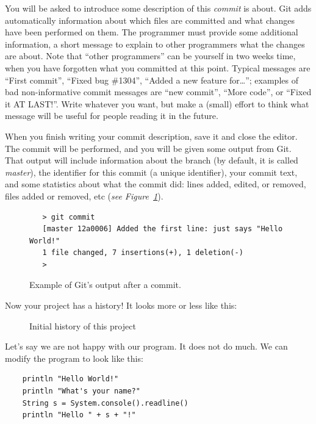 You will be asked to introduce some description of this \emph{commit}
is about. Git adds automatically information about which files are
committed and what changes have been performed on them. The programmer
must provide some additional information, a short message to explain
to other programmers what the changes are about. Note that ``other
programmers'' can be yourself in two weeks time, when you have
forgotten what you committed at this point. Typical messages are
``First commit'', ``Fixed bug \#1304'', ``Added a new feature
for\ldots''; examples of bad non-informative commit messages are ``new
commit'', ``More code'', or ``Fixed it AT LAST!''. Write whatever you
want, but make a (small) effort to think what message will be useful
for people reading it in the future.

When you finish writing your commit description, save it and close the
editor. The commit will be performed, and you will be given some
output from Git. That output will include information about the
branch (by default, it is called \emph{master}), the identifier for
this commit (a unique identifier), your commit text, and some 
statistics about what the commit did: lines added, edited, or removed,
files added or removed, etc (\emph{see
  Figure~\ref{fig:git-example-1}}). 

\begin{figure}[htbp!]
  \centering
  \begin{framed}
    \begin{verbatim}
   > git commit
   [master 12a0006] Added the first line: just says "Hello World!"
   1 file changed, 7 insertions(+), 1 deletion(-)
   >
   \end{verbatim}
  \end{framed}
  \caption{Example of Git's output after a commit.}
  \label{fig:git-example-1}
\end{figure}

Now your project has a history! It looks more or less like this:

\begin{figure}[htbp!]
  \centering
  \caption{Initial history of this project}
  \label{fig:git-example-2}
\end{figure}

Let's say we are not happy with our program. It does not do much. We
can modify the program to look like this:

\begin{verbatim}
    println "Hello World!"
    println "What's your name?"
    String s = System.console().readline()
    println "Hello " + s + "!"
\end{verbatim}

